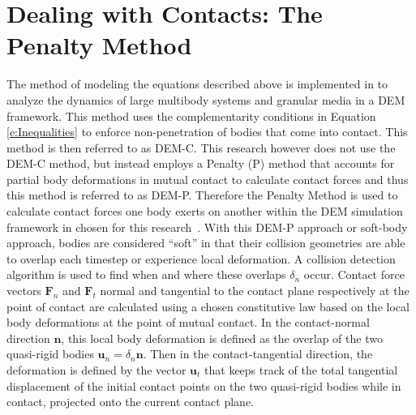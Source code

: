 \documentclass[12pt,onecolumn]{report}
\newcommand{\CHRONO}{{\sffamily{{Chrono}}}}
\begin{document}

\section{Dealing with Contacts: The Penalty Method}\label{s:Penalty}

The method of modeling the equations described above is implemented in {\CHRONO} to analyze the dynamics of large multibody systems and granular media in a DEM framework. This method uses the complementarity conditions in Equation \eqref{e:Inequalities} to enforce non-penetration of bodies that come into  contact. This method is then referred to as DEM-C. This research however does not use the DEM-C method, but instead employs a Penalty (P) method that accounts for partial body deformations in mutual contact to calculate contact forces and thus this method is referred to as DEM-P. Therefore the Penalty Method is used to calculate contact forces one body exerts on another within the DEM simulation framework in {\CHRONO} chosen for this research~\cite{Chrono2016}. With this DEM-P approach or soft-body approach, bodies are considered ``soft'' in that their collision geometries are able to overlap each timestep or experience local deformation. A collision detection algorithm is used to find when and where these overlaps $\delta_n$ occur. Contact force vectors $\boldsymbol{F}_n$ and $\boldsymbol{F}_t$ normal and tangential to the contact plane respectively at the point of contact are calculated using a chosen constitutive law based on the local body deformations at the point of mutual contact. In the contact-normal direction $\boldsymbol{n}$, this local body deformation is defined as the overlap of the two quasi-rigid bodies $\boldsymbol{u}_n = \delta_n\boldsymbol{n}$. Then in the contact-tangential direction, the deformation is defined by the vector $\boldsymbol{u}_t$ that keeps track of the total tangential displacement of the initial contact points on the two quasi-rigid bodies while in contact, projected onto the current contact plane. 
\end{document}
